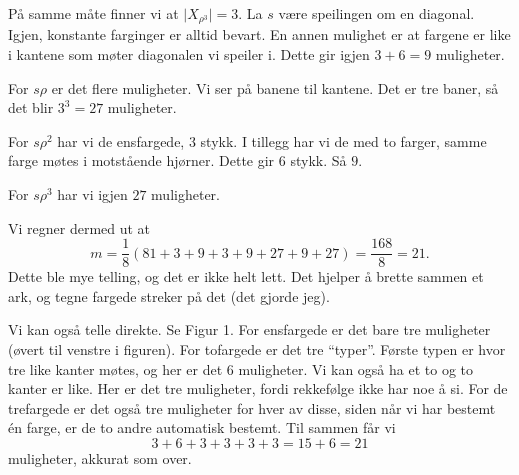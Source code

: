 \documentclass[11pt, norsk]{article}
\begin{document}
\begin{losn}
\begin{enumerate}[a)]
På samme måte finner vi at $\lvert X_{\rho^3} \rvert = 3$. La $s$ være speilingen om en diagonal. Igjen, konstante farginger er alltid bevart. En annen mulighet er at fargene er like i kantene som møter diagonalen vi speiler i. Dette gir igjen $3+6=9$ muligheter.

For $s\rho$ er det flere muligheter. Vi ser på banene til kantene. Det er tre baner, så det blir $3^3=27$ muligheter.

For $s\rho^2$ har vi de ensfargede, $3$ stykk. I tillegg har vi de med to farger, samme farge møtes i motstående hjørner. Dette gir $6$ stykk. Så $9$.

For $s \rho^3$ har vi igjen $27$ muligheter.

Vi regner dermed ut at 
\[
m = \frac{1}{8} \left( 81+3+9+3+9+27+9+27\right) = \frac{168}{8} = 21.
\]
Dette ble mye telling, og det er ikke helt lett. Det hjelper å brette sammen et ark, og tegne fargede streker på det (det gjorde jeg).

Vi kan også telle direkte. Se Figur 1. For ensfargede er det bare tre muligheter (øvert til venstre i figuren). For tofargede er det tre ``typer''. Første typen er hvor tre like kanter møtes, og her er det $6$ muligheter. Vi kan også ha et to og to kanter er like. Her er det tre muligheter, fordi rekkefølge ikke har noe å si. For de trefargede er det også tre muligheter for hver av disse, siden når vi har bestemt én farge, er de to andre automatisk bestemt. Til sammen får vi 
\[
3+6+3+3+3+3 = 15+6 = 21
\]
muligheter, akkurat som over.
\begin{figure}
\begin{center}
 
\end{center}
\end{figure}
\end{enumerate}
\end{losn}
\end{document}
